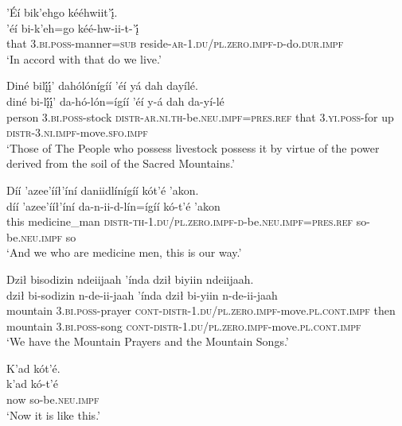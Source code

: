 \newpage
\ea\label{ex:text4-13-4}
’Éí bik’ehgo kééhwiit’į́.\\
\gll ’éí	bi-k’eh=go	kéé-hw-ii-t-’į́\\
     that	3.\textsc{bi}.\textsc{poss}-manner=\textsc{sub}	reside-\textsc{ar}-1.\textsc{du}/\textsc{pl}.\textsc{zero}.\textsc{impf}-\textsc{d}-do.\textsc{dur}.\textsc{impf}\\
\glt `In accord with that do we live.'
\z

\ea\label{ex:text4-13-5}
Diné bilį́į́’ dahólónígíí ’éí yá dah dayílé.\\
\gll diné	bi-lį́į́’	da-hó-lón=ígíí	’éí	y-á	dah	da-yí-lé\\
     person	3.\textsc{bi}.\textsc{poss}-stock	\textsc{distr}-\textsc{ar}.\textsc{ni}.\textsc{th}-be.\textsc{neu}.\textsc{impf}=\textsc{pres}.\textsc{ref}	that	3.\textsc{yi}.\textsc{poss}-for	up	\textsc{distr}-3.\textsc{ni}.\textsc{impf}-move.\textsc{sfo}.\textsc{impf}\\
\glt `Those of The People who possess livestock possess it by virtue of the power derived from the soil of the Sacred Mountains.'
\z

\ea\label{ex:text4-13-6}
Díí ’azee’ííł’íní daniidlínígíí kót’é ’akon.\\
\gll díí	’azee’ííł’íní	da-n-ii-d-lín=ígíí	kó-t’é	’akon\\
     this	medicine\_man	\textsc{distr}-\textsc{th}-1.\textsc{du}/\textsc{pl}.\textsc{zero}.\textsc{impf}-\textsc{d}-be.\textsc{neu}.\textsc{impf}=\textsc{pres}.\textsc{ref}	so-be.\textsc{neu}.\textsc{impf}	so\\
\glt `And we who are medicine men, this is our way.'
\z

\ea\label{ex:text4-13-7}
Dził bisodizin ndeiijaah ’índa dził biyiin ndeiijaah.\\
\gll dził	bi-sodizin	n-de-ii-jaah	’índa	dził	bi-yiin	n-de-ii-jaah\\
     mountain	3.\textsc{bi}.\textsc{poss}-prayer	\textsc{cont}-\textsc{distr}-1.\textsc{du}/\textsc{pl}.\textsc{zero}.\textsc{impf}-move.\textsc{pl}.\textsc{cont}.\textsc{impf}	then	mountain	3.\textsc{bi}.\textsc{poss}-song	\textsc{cont}-\textsc{distr}-1.\textsc{du}/\textsc{pl}.\textsc{zero}.\textsc{impf}-move.\textsc{pl}.\textsc{cont}.\textsc{impf}\\
\glt `We have the Mountain Prayers and the Mountain Songs.'
\z

\ea\label{ex:text4-13-8}
K’ad kót’é.\\
\gll k’ad	kó-t’é\\
     now	so-be.\textsc{neu}.\textsc{impf}\\
\glt `Now it is like this.'
\z
